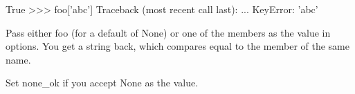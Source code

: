 \begin{python}
\begin{python}
    True                                                                                                                                                                                                                          
    >>> foo['abc']                                                                                                                                                                                                                
    Traceback (most recent call last):                                                                                                                                                                                            
    ...                                                                                                                                                                                                                           
    KeyError: 'abc'                                                                                                                                                                                                               
                                                                                                                                                                                                                                  
    Pass either foo (for a default of None) or one of the members                                                                                                                                                                 
    as the value in options{}. You get a string back, which compares                                                                                                                                                              
    equal to the member of the same name.                                                                                                                                                                                         
                                                                                                                                                                                                                                  
    Set none_ok if you accept None as the value.                                                                                                                                                                                  
                                                                                                                                                                                                                                  

\end{python}
\end{python}
